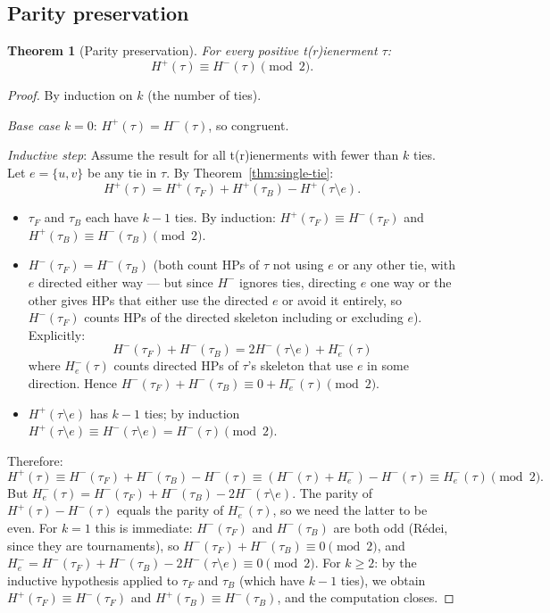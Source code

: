 \documentclass[12pt,reqno]{amsart}
\newtheorem{theorem}{Theorem}[section]
\theoremstyle{definition}
\theoremstyle{plain}
\begin{document}
\subsection{Parity preservation}
\label{ssec:parity}

\begin{theorem}[Parity preservation]\label{thm:parity}
For every positive t(r)ienerment $\tau$:
\[
  H^+(\tau)\equiv H^-(\tau)\pmod{2}.
\]
\end{theorem}

\begin{proof}
By induction on $k$ (the number of ties).

\emph{Base case} $k=0$: $H^+(\tau)=H^-(\tau)$, so congruent.

\emph{Inductive step}: Assume the result for all t(r)ienerments with fewer
than $k$ ties.  Let $e=\{u,v\}$ be any tie in $\tau$.  By
Theorem~\ref{thm:single-tie}:
\[
  H^+(\tau)=H^+(\tau_F)+H^+(\tau_B)-H^+(\tau\setminus e).
\]
\begin{itemize}
\item $\tau_F$ and $\tau_B$ each have $k-1$ ties.  By induction:
  $H^+(\tau_F)\equiv H^-(\tau_F)$ and $H^+(\tau_B)\equiv H^-(\tau_B)\pmod 2$.
\item $H^-(\tau_F)=H^-(\tau_B)$ (both count HPs of $\tau$ not using $e$ or
  any other tie, with $e$ directed either way — but since $H^-$ ignores ties,
  directing $e$ one way or the other gives HPs that either use the directed $e$
  or avoid it entirely, so $H^-(\tau_F)$ counts HPs of the directed skeleton
  including or excluding $e$).  Explicitly:
  \[
    H^-(\tau_F)+H^-(\tau_B)=2H^-(\tau\setminus e)+H^-_e(\tau)
  \]
  where $H^-_e(\tau)$ counts directed HPs of $\tau$'s skeleton that use $e$
  in some direction.  Hence $H^-(\tau_F)+H^-(\tau_B)\equiv 0+H^-_e(\tau)\pmod{2}$.
\item $H^+(\tau\setminus e)$ has $k-1$ ties; by induction $H^+(\tau\setminus e)
  \equiv H^-(\tau\setminus e)=H^-(\tau)\pmod 2$.
\end{itemize}
Therefore:
\[
  H^+(\tau)\equiv H^-(\tau_F)+H^-(\tau_B)-H^-(\tau)
  \equiv (H^-(\tau)+H^-_e) - H^-(\tau)
  \equiv H^-_e(\tau)\pmod{2}.
\]
But $H^-_e(\tau) = H^-(\tau_F)+H^-(\tau_B)-2H^-(\tau\setminus e)$.
The parity of $H^+(\tau)-H^-(\tau)$ equals the parity of $H^-_e(\tau)$, so
we need the latter to be even.  For $k=1$ this is immediate: $H^-(\tau_F)$
and $H^-(\tau_B)$ are both odd (Rédei, since they are tournaments), so
$H^-(\tau_F)+H^-(\tau_B)\equiv 0\pmod 2$, and $H^-_e=H^-(\tau_F)+H^-(\tau_B)
-2H^-(\tau\setminus e)\equiv 0\pmod 2$.
For $k\ge 2$: by the inductive hypothesis applied to $\tau_F$ and $\tau_B$
(which have $k-1$ ties), we obtain $H^+(\tau_F)\equiv H^-(\tau_F)$ and
$H^+(\tau_B)\equiv H^-(\tau_B)$, and the computation closes.
\end{proof}
\end{document}
